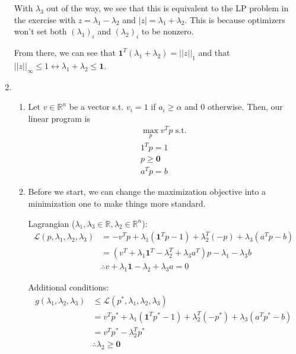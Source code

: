 \documentclass[12pt]{article}
\begin{document}
\begin{enumerate}
            With $\lambda_3$ out of the way, we see that this is equivalent
            to the LP problem in the exercise with $z=\lambda_1-\lambda_2$ and $|z|=\lambda_1+\lambda_2$.
            This is because optimizers won't set both $(\lambda_1)_i$ and $(\lambda_2)_i$ to be nonzero.

            From there, we can see that $\mathbf{1}^T (\lambda_1+\lambda_2)=||z||_1$
            and that $||z||_\infty \le 1 \leftrightarrow \lambda_1 + \lambda_2 \le \mathbf{1}$.

      \item \begin{enumerate}
                  \item Let $v \in \mathbb{R}^n$ be a vector s.t. $v_i=1$ if $a_i \ge \alpha$ and $0$ otherwise.
                        Then, our linear program is
                        \begin{gather*}
                              \max_{p} v^Tp \text{ s.t.} \\
                              1^Tp = 1 \\
                              p \ge \mathbf{0} \\
                              a^Tp = b
                        \end{gather*}
                  \item Before we start, we can change the maximization objective into
                        a minimization one to make things more standard.

                        Lagrangian ($\lambda_1, \lambda_3 \in \mathbb{R}, \lambda_2 \in \mathbb{R}^n$):
                        \begin{align*}
                              \mathcal{L}(p, \lambda_1, \lambda_2, \lambda_3)
                               & = -v^Tp+\lambda_1(\mathbf{1}^Tp-1)+\lambda_2^T(-p)+\lambda_3(a^Tp-b)              \\
                               & = (v^T+\lambda_1 \mathbf{1}^T - \lambda_2^T+\lambda_3 a^T)p-\lambda_1-\lambda_3 b \\
                               & \therefore v+\lambda_1\mathbf{1} - \lambda_2 + \lambda_3 a = 0
                        \end{align*}

                        Additional conditions:
                        \begin{align*}
                              g(\lambda_1, \lambda_2, \lambda_3)
                               & \le \mathcal{L}(p^*, \lambda_1, \lambda_2, \lambda_3)                       \\
                               & = v^Tp^*+\lambda_1(\mathbf{1}^Tp^*-1)+\lambda_2^T(-p^*)+\lambda_3(a^Tp^*-b) \\
                               & = v^Tp^*-\lambda_2^T p^*                                                    \\
                               & \therefore \lambda_2 \ge \mathbf{0}
                        \end{align*}


\end{enumerate}
\end{enumerate}
\end{document}
